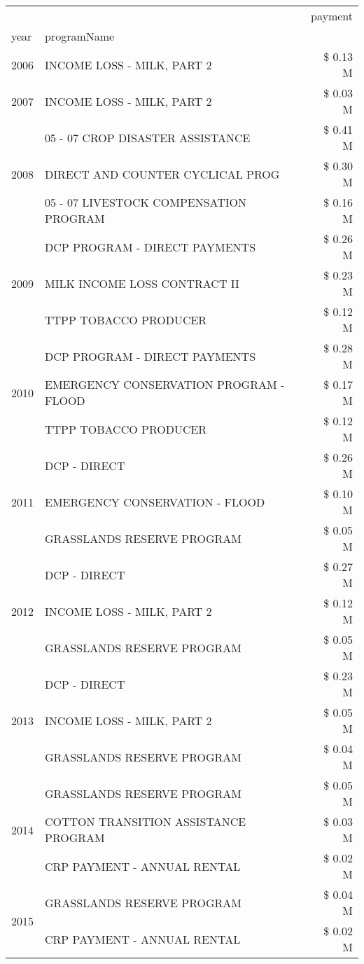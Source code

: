 \begin{tabular}{llr}
\toprule
 &  & payment \\
year & programName &  \\
\midrule
2006 & INCOME LOSS - MILK, PART 2 & \$ 0.13 M \\
\cline{1-3}
2007 & INCOME LOSS - MILK, PART 2 & \$ 0.03 M \\
\cline{1-3}
\multirow[t]{3}{*}{2008} & 05 - 07 CROP DISASTER ASSISTANCE & \$ 0.41 M \\
 & DIRECT AND COUNTER CYCLICAL PROG & \$ 0.30 M \\
 & 05 - 07 LIVESTOCK COMPENSATION PROGRAM & \$ 0.16 M \\
\cline{1-3}
\multirow[t]{3}{*}{2009} & DCP PROGRAM - DIRECT PAYMENTS & \$ 0.26 M \\
 & MILK INCOME LOSS CONTRACT II & \$ 0.23 M \\
 & TTPP TOBACCO PRODUCER & \$ 0.12 M \\
\cline{1-3}
\multirow[t]{3}{*}{2010} & DCP PROGRAM - DIRECT PAYMENTS & \$ 0.28 M \\
 & EMERGENCY CONSERVATION PROGRAM - FLOOD & \$ 0.17 M \\
 & TTPP TOBACCO PRODUCER & \$ 0.12 M \\
\cline{1-3}
\multirow[t]{3}{*}{2011} & DCP - DIRECT & \$ 0.26 M \\
 & EMERGENCY CONSERVATION - FLOOD & \$ 0.10 M \\
 & GRASSLANDS RESERVE PROGRAM & \$ 0.05 M \\
\cline{1-3}
\multirow[t]{3}{*}{2012} & DCP - DIRECT & \$ 0.27 M \\
 & INCOME LOSS - MILK, PART 2 & \$ 0.12 M \\
 & GRASSLANDS RESERVE PROGRAM & \$ 0.05 M \\
\cline{1-3}
\multirow[t]{3}{*}{2013} & DCP - DIRECT & \$ 0.23 M \\
 & INCOME LOSS - MILK, PART 2 & \$ 0.05 M \\
 & GRASSLANDS RESERVE PROGRAM & \$ 0.04 M \\
\cline{1-3}
\multirow[t]{3}{*}{2014} & GRASSLANDS RESERVE PROGRAM & \$ 0.05 M \\
 & COTTON TRANSITION ASSISTANCE PROGRAM & \$ 0.03 M \\
 & CRP PAYMENT - ANNUAL RENTAL & \$ 0.02 M \\
\cline{1-3}
\multirow[t]{3}{*}{2015} & GRASSLANDS RESERVE PROGRAM & \$ 0.04 M \\
 & CRP PAYMENT - ANNUAL RENTAL & \$ 0.02 M \\

\end{tabular}
